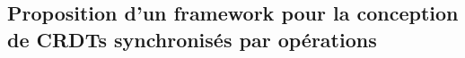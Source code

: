 \subsection{Proposition d'un framework pour la conception de \acp{CRDT} synchronisés par opérations}


% 

% 

% 

% 

% 

% 
